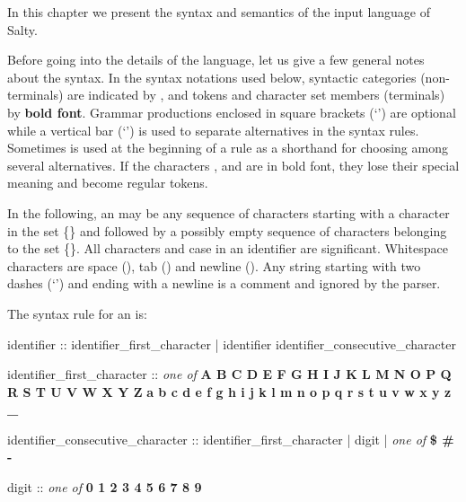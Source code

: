 
In this chapter we present the syntax and semantics of the input
language of Salty.

Before going into the details of the language, let us give a few general
notes about the syntax.
%
In the syntax notations used below, syntactic categories
(non-terminals) are indicated by , and tokens
and character set members (terminals) by \textbf{bold font}.
%
Grammar productions enclosed in square brackets (`\grammar{[]}') are
optional while a vertical bar (`\grammar{|}') is used to separate
alternatives in the syntax rules. Sometimes  is used
at the beginning of a rule as a shorthand for choosing among several
alternatives.
%
If the characters \grammar{\textbf{|}}, \grammar{\textbf{[}} and
\grammar{\textbf{]}} are in bold font, they lose their special
meaning and become regular tokens.

In the following, an  may be any sequence of
characters starting with a character in the set
\{{}\}
%
and followed by a possibly empty sequence of characters belonging to
the set
%
\{{}\}.
%
All characters and case in an identifier are significant. Whitespace
characters are space (\spc), tab (\tab) and newline (\ret).
%
Any string  starting with two
dashes (`\code{--}') and ending with a newline is a comment and
ignored by the parser. 

The syntax rule for an  is:

\begin{Grammar}
identifier :: 
        identifier_first_character
      | identifier identifier_consecutive_character

identifier_first_character :: \emph{one of}
        \textbf{A B C D E F G H I J K L M N O P Q R S T U V W X Y Z}
        \textbf{a b c d e f g h i j k l m n o p q r s t u v w x y z _}

identifier_consecutive_character :: 
        identifier_first_character
      | digit
      | \emph{one of} \textbf{\$ \# -}

digit :: \emph{one of} \textbf{0 1 2 3 4 5 6 7 8 9}
\end{Grammar}

